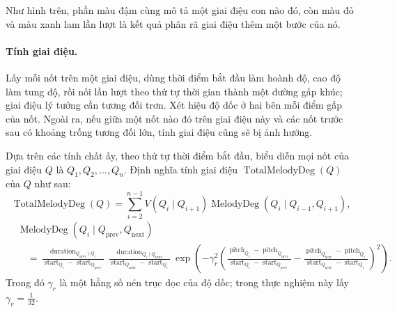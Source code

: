 \documentclass[11pt]{article}
\begin{document}
\begin{center}
\end{center}

Như hình trên, phần màu đậm cùng mô tả một giai điệu con nào đó, còn màu đỏ
và màu xanh lam lần lượt là kết quả phân rã giai điệu thêm một bước của nó.

\paragraph{Tính giai điệu.}
Lấy mỗi nốt trên một giai điệu, dùng thời điểm bắt đầu làm hoành độ, cao độ
làm tung độ, rồi nối lần lượt theo thứ tự thời gian thành một đường gấp khúc;
giai điệu lý tưởng cần tương đối trơn. Xét hiệu độ dốc ở hai bên mỗi điểm gấp
của nốt. Ngoài ra, nếu giữa một nốt nào đó trên giai điệu này và các nốt
trước sau có khoảng trống tương đối lớn, tính giai điệu cũng sẽ bị ảnh hưởng.

Dựa trên các tính chất ấy, theo thứ tự thời điểm bắt đầu, biểu diễn mọi nốt
của giai điệu \(Q\) là \(Q_1,Q_2,\ldots,Q_n\). Định nghĩa tính giai điệu
\(\operatorname{TotalMelodyDeg}(Q)\) của \(Q\) như sau:
\[
  \operatorname{TotalMelodyDeg}(Q)=
  \sum_{i=2}^{n-1}V(Q_i\mid Q_{i+1})
  \operatorname{MelodyDeg}(Q_i\mid Q_{i-1},Q_{i+1}),
\]
\[
\begin{aligned}
&\operatorname{MelodyDeg}(Q_i\mid Q_{\operatorname{prev}},Q_{\operatorname{next}})\\
&\quad =
\frac{\operatorname{duration}_{Q_{\operatorname{prev}}\mid Q_i}}
     {\operatorname{start}_{Q_i}-\operatorname{start}_{Q_{\operatorname{prev}}}}
\frac{\operatorname{duration}_{Q_i\mid Q_{\operatorname{next}}}}
     {\operatorname{start}_{Q_{\operatorname{next}}}-\operatorname{start}_{Q_i}}
\exp\left(
-\gamma_r^2
\left(
\frac{\operatorname{pitch}_{Q_i}-\operatorname{pitch}_{Q_{\operatorname{prev}}}}
     {\operatorname{start}_{Q_i}-\operatorname{start}_{Q_{\operatorname{prev}}}}
-
\frac{\operatorname{pitch}_{Q_{\operatorname{next}}}-\operatorname{pitch}_{Q_i}}
     {\operatorname{start}_{Q_{\operatorname{next}}}-\operatorname{start}_{Q_i}}
\right)^2
\right).
\end{aligned}
\]
Trong đó \(\gamma_r\) là một hằng số nén trục dọc của độ dốc; trong thực
nghiệm này lấy \(\gamma_r=\frac{1}{32}\).
\end{document}
